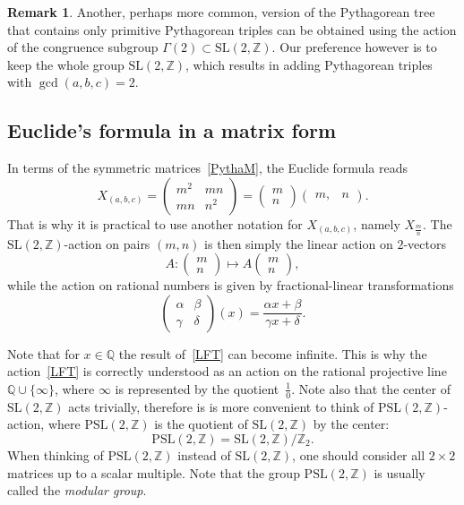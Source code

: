 \documentclass{article}[12pt]
\theoremstyle{plain}
\theoremstyle{definition}
\newtheorem*{rem}{Remark}
\newcommand{\Z}{\mathbb{Z}}
\newcommand{\Q}{\mathbb{Q}}
\newcommand{\SL}{\mathrm{SL}}
\newcommand{\PSL}{\mathrm{PSL}}
\def\a{\alpha}
\def\b{\beta}
\def\d{\delta}
\def\g{\gamma}
\begin{document}
\begin{rem}
Another, perhaps more common, version of the Pythagorean tree that
contains only primitive Pythagorean triples can be obtained using the action
of the congruence subgroup $\Gamma(2)\subset\SL(2,\Z)$.
Our preference however is to keep the whole group $\SL(2,\Z)$,
which results in adding Pythagorean triples with $\gcd(a,b,c)=2$.
\end{rem}


\subsection{Euclide's formula in a matrix form}


In terms of the symmetric matrices~\eqref{PythaM}, the Euclide formula reads
$$
X_{(a,b,c)}=
\begin{pmatrix}
m^2&mn\\
mn&n^2
\end{pmatrix}=
\begin{pmatrix}
m\\
n
\end{pmatrix}
\begin{pmatrix}m, &n\end{pmatrix}.
$$
That is why it is practical to use another notation for $X_{(a,b,c)}$, namely
$X_{\frac{m}{n}}$.
The $\SL(2,\Z)$-action on pairs $(m,n)$ is then simply the linear action on $2$-vectors
$$
A:\begin{pmatrix}
m\\
n
\end{pmatrix}
\mapsto
A\begin{pmatrix}
m\\
n
\end{pmatrix},
$$
while the action on rational numbers is given by fractional-linear transformations
\begin{equation}
\label{LFT}
\begin{pmatrix}
\a&\b\\%
\g&\d
\end{pmatrix}\left(x\right)=
\frac{\a x+\b}{\g x+\d}.
\end{equation}

Note that for $x\in\Q$ the result of~\eqref{LFT} can become infinite.
This is why the action~\eqref{LFT} is correctly understood as an action
on the rational projective line $\Q\cup\{\infty\}$,
where $\infty$ is represented by the quotient~$\frac{1}{0}$.
Note also that the center of  $\SL(2,\Z)$ acts trivially, therefore
is is more convenient to think of  $\PSL(2,\Z)$-action,
where $\PSL(2,\Z)$ is the quotient of $\SL(2,\Z)$ by the center: 
$$
\PSL(2,\Z)=\SL(2,\Z)/\Z_2.
$$
When thinking of $\PSL(2,\Z)$ instead of $\SL(2,\Z)$, one should
consider all $2\times2$ matrices up to a scalar multiple.
Note that the group $\PSL(2,\Z)$ is usually called the {\it modular group}.
\end{document}
